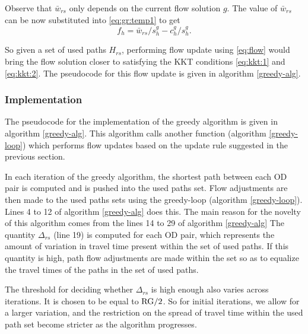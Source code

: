 Observe that $\bar{w}_{rs}$ only depends on the current flow solution
$g$. The value of $\bar{w}_{rs}$ can be now substituted
into \eqref{eq:gr:temp1} to get
\begin{equation}\label{eq:flow}
	f_h = \bar{w}_{rs}/s_h^g - c_h^g/s_h^g.
\end{equation}

So given a set of used paths $H_{rs}$, performing flow update
using \eqref{eq:flow} would bring the flow solution closer
to satisfying the KKT conditions \eqref{eq:kkt:1} and \eqref{eq:kkt:2}.
The pseudocode for this flow update is given in
algorithm \ref{greedy-alg}.


\subsubsection{Implementation}
The pseudocode for the implementation of the greedy algorithm
is given in algorithm \ref{greedy-alg}. This algorithm calls
another function (algorithm \ref{greedy-loop}) which performs
flow updates based on the
update rule suggested in the previous section.

In each iteration of the greedy algorithm, the shortest
path between each OD pair is computed and is pushed
into the used paths set. Flow adjustments are then made
to the used paths sets using the greedy-loop (algorithm \ref{greedy-loop}).
Lines 4 to 12 of algorithm \ref{greedy-alg} does this.
The main reason for the novelty of this algorithm comes
from the lines 14 to 29 of algorithm \ref{greedy-alg}
The quantity $\Delta_{rs}$ (line 19) is computed for each OD pair,
which represents the amount of variation in travel time present
within the set of used paths. If this quantity is high,
path flow adjustments are made within the set so as to equalize the
travel times of the paths in the set of used paths.

The threshold for deciding whether $\Delta_{rs}$ is high enough also
varies across iterations. It is chosen to be equal to $\hbox{RG}/2$.
So for initial iterations, we allow for a larger variation, and
the restriction on the spread of travel time within the used
path set become stricter as the algorithm progresses.





